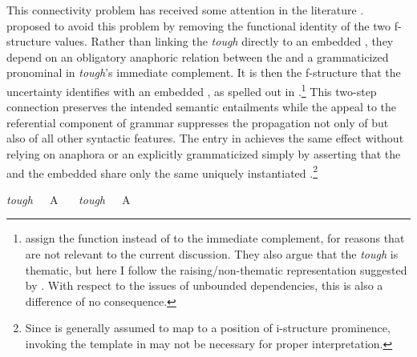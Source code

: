\documentclass[output=paper,hidelinks]{langscibook}
\begin{document}
\noindent  This 
connectivity problem has received some attention in the literature \citep[e.g.][]{HukariLevine1991,dalrympleking2000}.  \cite{dalrympleking2000} proposed to avoid this problem by removing the functional identity of the two f-structure values.  Rather than linking the \textit{tough} \SUBJ directly to an embedded \OBJ, they depend on an obligatory anaphoric relation between the \SUBJ and a grammaticized pronominal  \TOPIC in \textit{tough}'s immediate complement. It is then the \TOPIC f-structure that the uncertainty  identifies with an embedded \OBJ, as spelled out in .\footnote{\citet{dalrympleking2000} assign the function \COMP instead of \XCOMP to the immediate complement, for reasons that are not relevant to the current discussion. They also argue that the \textit{tough} \SUBJ is thematic, but here I follow the raising/non-thematic representation suggested by \citet{kaplanbresnan82}. With respect to the issues of unbounded dependencies, this is also a difference of no consequence.}  This two-step connection preserves the intended semantic entailments while the appeal to the referential component of grammar suppresses the propagation not only of \CASE but also of all other syntactic features.  The entry in  achieves the same effect without relying on anaphora or an explicitly grammaticized \TOPIC simply by asserting that the \SUBJ and the embedded \OBJ share only the same uniquely instantiated \PRED.\footnote{Since \SUBJ is generally assumed to map to a position of i-structure prominence, invoking the  \TOPIC template in  may not be necessary for proper interpretation.}    

\ea
\ea\label{toughtopic}  \textit{tough}\ \ \ A\ \ \ 
\ex\label{toughpredlink}
  \textit{tough}\ \ \ A\ \ \ 
\z\z
\end{document}
